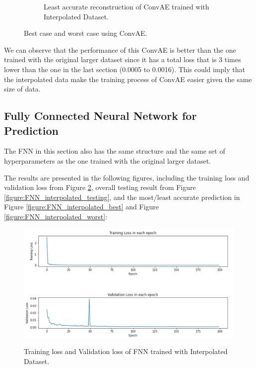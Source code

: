 \begin{figure}[H]
\begin{subfigure}{0.45\textwidth}
    \caption{Least accurate reconstruction of ConvAE trained with Interpolated Dataset.}
\end{subfigure}
\caption{Best case and worst case using ConvAE.}
\label{figure:ConvAE_interpolated_best_worst}
\end{figure}

We can observe that the performance of this ConvAE is better than the one trained with the original larger dataset since it has a total loss that is 3 times lower than the one in the last section (0.0005 to 0.0016). This could imply that the interpolated data make the training process of ConvAE easier given the same size of data. 


\subsection{Fully Connected Neural Network for Prediction}

The FNN in this section also has the same structure and the same set of hyperparameters as the one trained with the original larger dataset.

The results are presented in the following figures, including the training loss and validation loss from Figure \ref{figure:FNN_interpolated_losses}, overall testing result from Figure \ref{figure:FNN_interpolated_testing}, and the most/least accurate prediction in Figure \ref{figure:FNN_interpolated_best} and Figure \ref{figure:FNN_interpolated_worst}:

\begin{figure}[H]
    \caption{Training loss and Validation loss of FNN trained with Interpolated Dataset.}
    \includegraphics[scale=0.6]{figures/mantle_convection_images/larger_dataset_interpolated/FNN_trainingData.png}
    \label{figure:FNN_interpolated_losses}
\end{figure}


